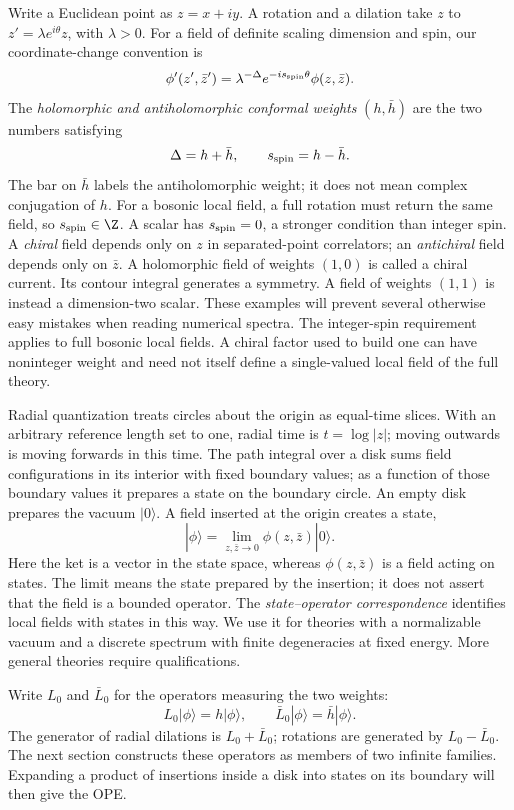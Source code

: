 Write a Euclidean point as $z=x+iy$. A rotation and a dilation take
$z$ to $z'=\lambda e^{i\theta}z$, with $\lambda>0$. For a field
of definite scaling dimension and spin, our coordinate-change
convention is
\[
 \phi'(z',\bar z')=\lambda^{-\Delta}e^{-i s_{\rm spin}\theta}
                         \phi(z,\bar z).
\]
The \emph{holomorphic and antiholomorphic conformal weights}
$(h,\bar h)$ are the two numbers satisfying
\begin{equation}
 \Delta=h+\bar h,\qquad s_{\rm spin}=h-\bar h.
 \label{eq:cft-dimension-spin}
\end{equation}
The bar on $\bar h$ labels the antiholomorphic weight; it does not
mean complex conjugation of $h$.
For a bosonic local field, a full rotation must return the same field,
so $s_{\rm spin}\in\Z$. A scalar has $s_{\rm spin}=0$, a stronger
condition than integer spin. A \emph{chiral} field depends only on
$z$ in separated-point correlators; an \emph{antichiral} field depends
only on $\bar z$. A holomorphic field of weights $(1,0)$ is called
a chiral current. Its contour integral generates a symmetry. A field
of weights $(1,1)$ is instead a dimension-two scalar.
These examples will prevent several otherwise easy mistakes when
reading numerical spectra.
The integer-spin requirement applies to full bosonic local fields.
A chiral factor used to build one can have noninteger weight and
need not itself define a single-valued local field of the full theory.

Radial quantization treats circles about the origin as equal-time
slices. With an arbitrary reference length set to one, radial time is
$t=\log|z|$; moving outwards is moving forwards in this time. The
path integral over a disk sums field configurations in its interior
with fixed boundary values; as a function of those boundary values
it prepares a state on the boundary circle. An empty disk prepares the
vacuum $|0\rangle$. A field inserted at the origin creates a state,
\[
 |\phi\rangle=\lim_{z,\bar z\to0}\phi(z,\bar z)|0\rangle.
\]
Here the ket is a vector in the state space, whereas $\phi(z,\bar z)$
is a field acting on states. The limit means the state prepared by the
insertion; it does not assert that the field is a bounded operator.
The \emph{state--operator correspondence} identifies local fields
with states in this way. We use it for theories with a normalizable
vacuum and a discrete spectrum with finite degeneracies at fixed
energy. More general theories require qualifications.

Write $L_0$ and $\bar L_0$ for the operators measuring the two
weights:
\[
 L_0|\phi\rangle=h|\phi\rangle,\qquad
 \bar L_0|\phi\rangle=\bar h|\phi\rangle.
\]
The generator of radial dilations is $L_0+\bar L_0$; rotations are
generated by $L_0-\bar L_0$. The next section constructs these
operators as members of two infinite families. Expanding a product of
insertions inside a disk into states on its boundary will then give
the OPE.

